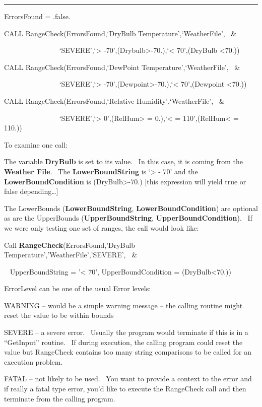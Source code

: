\begin{center}\rule{0.5\linewidth}{0.4pt}\end{center}

ErrorsFound = .false.

CALL RangeCheck(ErrorsFound,`DryBulb Temperature',`WeatherFile',~ \&

~~~~~~~~~~~~~~~ `SEVERE',`\textgreater{} -70',(Drybulb\textgreater{}-70.),`\textless{} 70',(DryBulb \textless{}70.))

CALL RangeCheck(ErrorsFound,`DewPoint Temperature',`WeatherFile',~ \&

~~~~~~~~~~~~~~~ `SEVERE',`\textgreater{} -70',(Dewpoint\textgreater{}-70.),`\textless{} 70',(Dewpoint \textless{}70.))

CALL RangeCheck(ErrorsFound,`Relative Humidity',`WeatherFile',~ \&

~~~~~~~~~~~~~~~ `SEVERE',`\textgreater{} 0',(RelHum\textgreater{} = 0.),`\textless{} = 110',(RelHum\textless{} = 110.))

To examine one call:

The variable \textbf{DryBulb} is set to its value.~ In this case, it is coming from the \textbf{Weather File}.~ The \textbf{LowerBoundString} is `\textgreater{} - 70' and the \textbf{LowerBoundCondition} is (DryBulb\textgreater{}-70.) {[}this expression will yield true or false depending\ldots{}{]}

The LowerBounds (\textbf{LowerBoundString}, \textbf{LowerBoundCondition}) are optional as are the UpperBounds (\textbf{UpperBoundString}, \textbf{UpperBoundCondition}).~ If we were only testing one set of ranges, the call would look like:

Call \textbf{RangeCheck}(ErrorsFound,'DryBulb Temperature','WeatherFile','SEVERE',~ \&

~ UpperBoundString = '\textless{} 70', UpperBoundCondition = (DryBulb\textless{}70.))

ErrorLevel can be one of the usual Error levels:

WARNING -- would be a simple warning message -- the calling routine might reset the value to be within bounds

SEVERE -- a severe error.~ Usually the program would terminate if this is in a ``GetInput'' routine.~ If during execution, the calling program could reset the value but RangeCheck contains too many string comparisons to be called for an execution problem.

FATAL -- not likely to be used.~ You want to provide a context to the error and if really a fatal type error, you'd like to execute the RangeCheck call and then terminate from the calling program.

